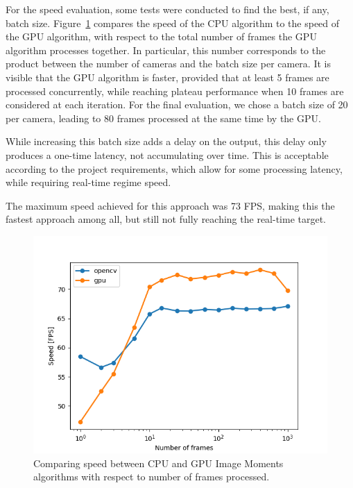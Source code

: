 For the speed evaluation, some tests were conducted to find the best, if any, batch size.
Figure~\ref{fig:locate:moments-cpu-vs-gpu} compares the speed of the CPU algorithm to the speed of the GPU algorithm, with respect to the total number of frames the GPU algorithm processes together.
In particular, this number corresponds to the product between the number of cameras and the batch size per camera.
It is visible that the GPU algorithm is faster, provided that at least 5 frames are processed concurrently, while reaching plateau performance when 10 frames are considered at each iteration.
For the final evaluation, we chose a batch size of 20 per camera, leading to 80 frames processed at the same time by the GPU.

While increasing this batch size adds a delay on the output, this delay only produces a one-time latency, not accumulating over time.
This is acceptable according to the project requirements, which allow for some processing latency, while requiring real-time regime speed.

The maximum speed achieved for this approach was 73 FPS, making this the fastest approach among all, but still not fully reaching the real-time target.

\begin{figure}
	\centerline{\includegraphics[width=.6\textwidth]{images/moments_opencv_vs_gpu.png}}
	\caption{\centering Comparing speed between CPU and GPU Image Moments algorithms with respect to number of frames processed.}
	\label{fig:locate:moments-cpu-vs-gpu}
\end{figure}
